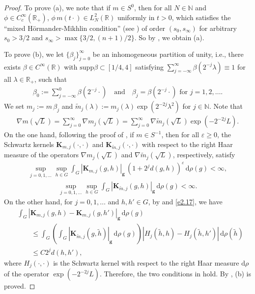 \documentclass[a4paper,12pt]{amsart}
\numberwithin{equation}{section}
\theoremstyle{definition}
\theoremstyle{remark}
\numberwithin{theorem}{section}
\newcommand{\R}{\mathbb{R}}
\newcommand{\supp}{\mathrm{supp}}
\newcommand{\g}{\mathbf{g}}
\renewcommand{\d}{\mathrm{d}}
\begin{document}
\begin{proof}
To prove (a), we note that if $m\in S^0$, then for all $N\in\mathbb{N}$ and $\phi\in C^\infty_c(\R_+)$, $\phi\, m(t\cdot)\in L^2_N(\R)$ uniformly in $t>0$, which satisfies the ``mixed H\"{o}rmander-Mikhlin condition'' (see \cite[Proposition 4.2]{Va}) of order $(s_0,s_\infty)$ for arbitrary $s_0>3/2$ and $s_\infty>\max\{3/2,(n+1)/2\}$. So by \cite[Proposition 4.2]{Va}, we obtain (a).

To prove (b), we let $\{\beta_j\}_{j=0}^\infty$ be an inhomogeneous partition of unity, i.e., there exists $\beta\in C^\infty(\R)$ with $\supp \beta\subset [1/4,4]$ satisfying $\sum_{j=-\infty}^\infty \beta(2^{-j}\lambda)\equiv 1$ for all $\lambda \in \R_+$, such that
\begin{align*}
\beta_0:=\sum_{j=-\infty}^0\beta(2^{-j}\cdot)\quad \text{and}\quad \beta_j=\beta(2^{-j}\cdot)\text{ for }j=1,2,\dots.
\end{align*}
We set $m_j:=m\,\beta_j$ and $\widetilde{m}_j(\lambda):=m_j(\lambda)\exp(2^{-2j}\lambda^2)$ for $j\in\mathbb{N}$. Note that
\begin{align*}
\nabla m(\sqrt{L})=\sum_{j=0}^\infty \nabla m_j(\sqrt{L})=\sum_{j=0}^\infty \nabla \widetilde{m}_j(\sqrt{L})\exp(-2^{-2j}L).
\end{align*}
On the one hand, following the proof of \cite[Proposition 5.2]{MuVa}, if $m\in S^{-1}$, then for all $\varepsilon\geq 0$, the Schwartz kernels $\mathbf{K}_{m,j}(\cdot,\cdot)$ and $\mathbf{K}_{\widetilde{m},j}(\cdot,\cdot)$ with respect to the right Haar measure of the operators $\nabla m_j(\sqrt{L})$ and $\nabla\widetilde{m}_j(\sqrt{L})$, respectively, satisfy
\begin{align}\label{eq:2.16.1}
\sup_{j=0,1,\dots}\sup_{h\in G}\int_G|\mathbf{K}_{m,j}(g,h)|_\g\,(1+2^jd(g,h))^\varepsilon\,\d\rho(g)<\infty,
\end{align}
\begin{align}\label{e2.17}
\sup_{j=0,1,\dots}\sup_{h\in G}\int_G|\mathbf{K}_{\widetilde{m},j}(g,h)|_\g\,\d\rho(g)<\infty.
\end{align}
On the other hand, for $j=0,1,\dots$ and $h,h'\in G$, by \cite[Lemma 6.3]{HeSt} and \eqref{e2.17}, we have
\begin{align*}
&\int_G|\mathbf{K}_{m,j}(g,h)-\mathbf{K}_{m,j}(g,h')|_\g\,\d\rho(g)\\
&\qquad\leq \int_G\left(\int_G|\mathbf{K}_{\widetilde{m},j}(g,\widetilde{h})|_\g\,\d\rho(g)\right)|H_j(\widetilde{h},h)-H_j(\widetilde{h},h')|\,\d\rho(\widetilde{h})\\
&\qquad\leq C 2^jd(h,h'),
\end{align*}
where $H_j(\cdot,\cdot)$ is the Schwartz kernel with respect to the right Haar measure $\d\rho$ of the operator $\exp(-2^{-2j}L)$. Therefore, the two conditions in \cite[Theorem 1.2]{HeSt} hold. By \cite[Theorem 4.1]{Va}, (b) is proved.
\end{proof}
\medskip
\end{document}
